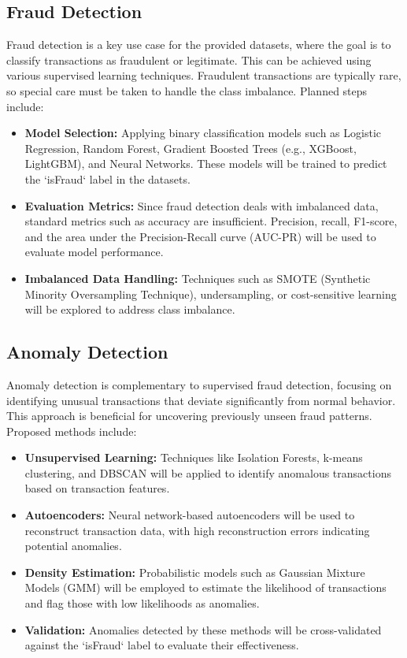 \documentclass[12pt,a4paper, hidelinks]{article}
\begin{document}
\subsection{Fraud Detection}
Fraud detection is a key use case for the provided datasets, where the goal is to classify transactions as fraudulent or legitimate. This can be achieved using various supervised learning techniques. Fraudulent transactions are typically rare, so special care must be taken to handle the class imbalance. Planned steps include:
\begin{itemize}
    \item \textbf{Model Selection:} Applying binary classification models such as Logistic Regression, Random Forest, Gradient Boosted Trees (e.g., XGBoost, LightGBM), and Neural Networks. These models will be trained to predict the `isFraud` label in the datasets.
    \item \textbf{Evaluation Metrics:} Since fraud detection deals with imbalanced data, standard metrics such as accuracy are insufficient. Precision, recall, F1-score, and the area under the Precision-Recall curve (AUC-PR) will be used to evaluate model performance.
    \item \textbf{Imbalanced Data Handling:} Techniques such as SMOTE (Synthetic Minority Oversampling Technique), undersampling, or cost-sensitive learning will be explored to address class imbalance.
\end{itemize}

\subsection{Anomaly Detection}
Anomaly detection is complementary to supervised fraud detection, focusing on identifying unusual transactions that deviate significantly from normal behavior. This approach is beneficial for uncovering previously unseen fraud patterns. Proposed methods include:
\begin{itemize}
    \item \textbf{Unsupervised Learning:} Techniques like Isolation Forests, k-means clustering, and DBSCAN will be applied to identify anomalous transactions based on transaction features. 
    \item \textbf{Autoencoders:} Neural network-based autoencoders will be used to reconstruct transaction data, with high reconstruction errors indicating potential anomalies.
    \item \textbf{Density Estimation:} Probabilistic models such as Gaussian Mixture Models (GMM) will be employed to estimate the likelihood of transactions and flag those with low likelihoods as anomalies.
    \item \textbf{Validation:} Anomalies detected by these methods will be cross-validated against the `isFraud` label to evaluate their effectiveness.
\end{itemize}
\end{document}
